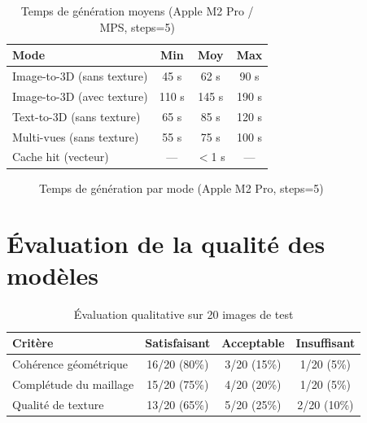 \documentclass[12pt,a4paper,oneside]{report}
\begin{document}
\begin{table}[H]
\centering
\caption{Temps de génération moyens (Apple M2 Pro / MPS, steps=5)}
\label{tab:perf}
\begin{tabular}{@{}lccc@{}}
\toprule
\textbf{Mode} & \textbf{Min} & \textbf{Moy} & \textbf{Max} \\\midrule
Image-to-3D (sans texture) & 45 s  & 62 s  & 90 s  \\
Image-to-3D (avec texture) & 110 s & 145 s & 190 s \\
Text-to-3D (sans texture)  & 65 s  & 85 s  & 120 s \\
Multi-vues (sans texture)  & 55 s  & 75 s  & 100 s \\
Cache hit (vecteur)        & — & $<$1 s & —     \\
\bottomrule
\end{tabular}
\end{table}

\begin{figure}[H]
\centering
{}
\caption{Temps de génération par mode (Apple M2 Pro, steps=5)}
\label{fig:perf}
\end{figure}

\section{Évaluation de la qualité des modèles}

\begin{table}[H]
\centering
\caption{Évaluation qualitative sur 20 images de test}
\label{tab:qual}
\begin{tabular}{@{}lccc@{}}
\toprule
\textbf{Critère} & \textbf{Satisfaisant} & \textbf{Acceptable} & \textbf{Insuffisant} \\\midrule
Cohérence géométrique & 16/20 (80\%) & 3/20 (15\%) & 1/20 (5\%) \\
Complétude du maillage & 15/20 (75\%) & 4/20 (20\%) & 1/20 (5\%) \\
Qualité de texture    & 13/20 (65\%) & 5/20 (25\%) & 2/20 (10\%) \\
\bottomrule
\end{tabular}
\end{table}
\end{document}
